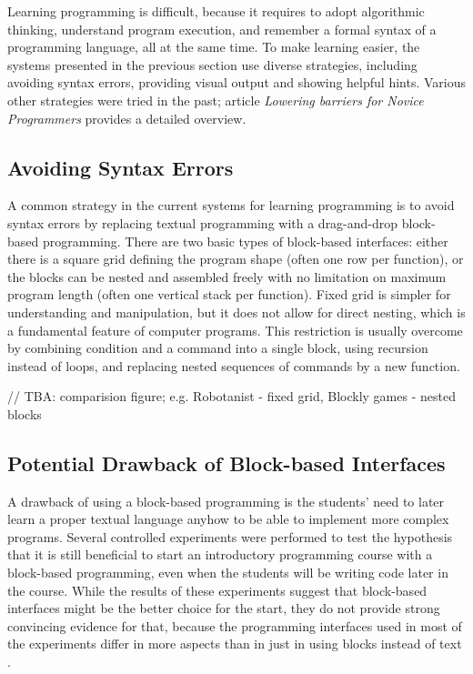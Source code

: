 \documentclass[
    digital,
    color,
    11pt,
    nocover,
    table,  %
    nolof,  %
    nolot,  %
    microtype,
]{fithesis3}
\begin{document}
Learning programming is difficult,
  because it requires
  to adopt algorithmic thinking,
  understand program execution,
  and remember a formal syntax of a programming language,
  all at the same time.
To make learning easier,
  the systems presented in the previous section use diverse strategies,
  including avoiding syntax errors,
  providing visual output
  and showing helpful hints.
Various other strategies were tried in the past;
article \emph{Lowering barriers for Novice Programmers}
  \cite{lowering-barriers}
  provides a detailed overview.


\subsection{Avoiding Syntax Errors}
\label{sec:avoiding-syntax-errors}

A common strategy in the current systems for learning programming is to avoid syntax errors
  by replacing textual programming with a drag-and-drop block-based programming.
There are two basic types of block-based interfaces:
  either there is a square grid defining the program shape
  (often one row per function),
  or the blocks can be nested and assembled freely with no limitation on maximum program length
  (often one vertical stack per function).
Fixed grid is simpler for understanding and manipulation,
  but it does not allow for direct nesting,
  which is a fundamental feature of computer programs.
This restriction is usually overcome by
  combining condition and a command into a single block,
  using recursion instead of loops,
  and replacing nested sequences of commands by a new function.

// TBA: comparision figure; e.g. Robotanist - fixed grid, Blockly games - nested blocks


\subsection{Potential Drawback of Block-based Interfaces}
\label{sec:potential-drawback-of-block-based-interfaces}
A drawback of using a block-based programming
  is the students' need to later learn a proper textual language anyhow
  to be able to implement more complex programs.
Several controlled experiments were performed to test the hypothesis
  that it is still beneficial to start an introductory programming course
  with a block-based programming,
  even when the students will be writing code later in the course.
While the results of these experiments suggest that block-based interfaces
  might be the better choice for the start,
  they do not provide strong convincing evidence for that,
  because the programming interfaces used in most of the experiments differ in more aspects
  than in just in using blocks instead of text
  \cite{comparing-textual-and-block-interfaces}.
\end{document}
